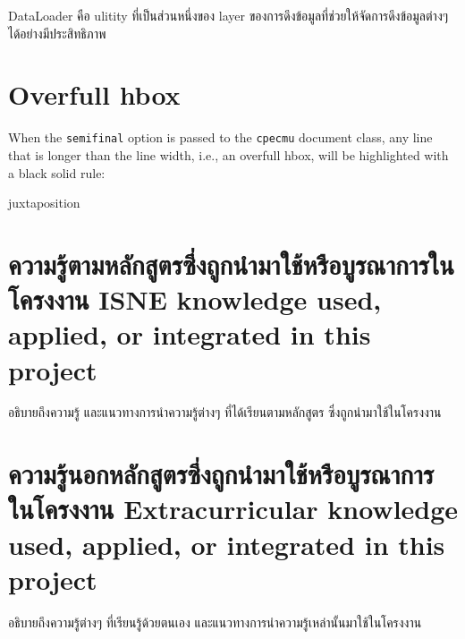 \enskip DataLoader \cite{dataloader} คือ ulitity ที่เป็นส่วนหนึ่งของ layer ของการดึงข้อมูลที่ช่วยให้จัดการดึงข้อมูลต่างๆ ได้อย่างมีประสิทธิภาพ

\section{Overfull hbox}

When the \verb.semifinal. option is passed to the \verb.cpecmu. document class,
any line that is longer than the line width, i.e., an overfull hbox, will be
highlighted with a black solid rule:
\begin{center}
\begin{minipage}{2em}
juxtaposition
\end{minipage}
\end{center}

\section{\ifcpe%
ความรู้ตามหลักสูตรซึ่งถูกนำมาใช้หรือบูรณาการในโครงงาน
\else%
ISNE knowledge used, applied, or integrated in this project
\fi
}

อธิบายถึงความรู้ และแนวทางการนำความรู้ต่างๆ ที่ได้เรียนตามหลักสูตร ซึ่งถูกนำมาใช้ในโครงงาน

\section{\ifcpe%
ความรู้นอกหลักสูตรซึ่งถูกนำมาใช้หรือบูรณาการในโครงงาน
\else%
Extracurricular knowledge used, applied, or integrated in this project
\fi
}

อธิบายถึงความรู้ต่างๆ ที่เรียนรู้ด้วยตนเอง และแนวทางการนำความรู้เหล่านั้นมาใช้ในโครงงาน
